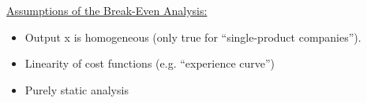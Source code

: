 \begin{enumerate}
\begin{solution}
		\uline{Assumptions of the Break-Even Analysis:}
			\begin{itemize}
				\item Output x is homogeneous (only true for ``single-product companies'').
				\item Linearity of cost functions (e.g. ``experience curve'')
				\item Purely static analysis
			\end{itemize}
	\end{solution}
\end{enumerate}

\ifprintanswers
\else
\newpage
\fi